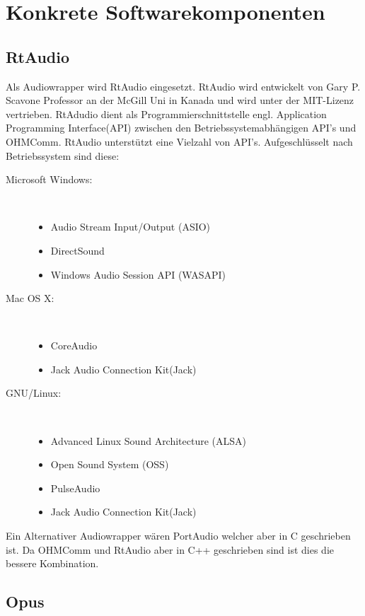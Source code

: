 \FloatBarrier

\section{Konkrete Softwarekomponenten}
\subsection{RtAudio}
\label{sec:RtAudio}
Als Audiowrapper wird RtAudio eingesetzt. RtAudio wird entwickelt von Gary P. Scavone Professor an der McGill Uni in Kanada und wird unter der MIT-Lizenz vertrieben. RtAdudio dient als Programmierschnittstelle engl. Application Programming Interface(API) zwischen den Betriebssystemabhängigen API's und OHMComm. RtAudio unterstützt eine Vielzahl von API's. Aufgeschlüsselt nach Betriebssystem sind diese:

\begin{description}
\item[Microsoft Windows:]~\par
\begin{itemize}
\item Audio Stream Input/Output (ASIO)
\item DirectSound
\item Windows Audio Session API (WASAPI)
\end{itemize}
\item[Mac OS X:]~\par
\begin{itemize}
\item CoreAudio
\item Jack Audio Connection Kit(Jack)
\end{itemize}
\item[GNU/Linux:]~\par
\begin{itemize}
\item Advanced Linux Sound Architecture (ALSA)
\item Open Sound System (OSS)
\item PulseAudio
\item Jack Audio Connection Kit(Jack)
\end{itemize} 
\end{description}

Ein Alternativer Audiowrapper wären PortAudio welcher aber in C geschrieben ist. Da OHMComm und RtAudio aber in C++ geschrieben sind ist dies die bessere Kombination.

\subsection{Opus}

